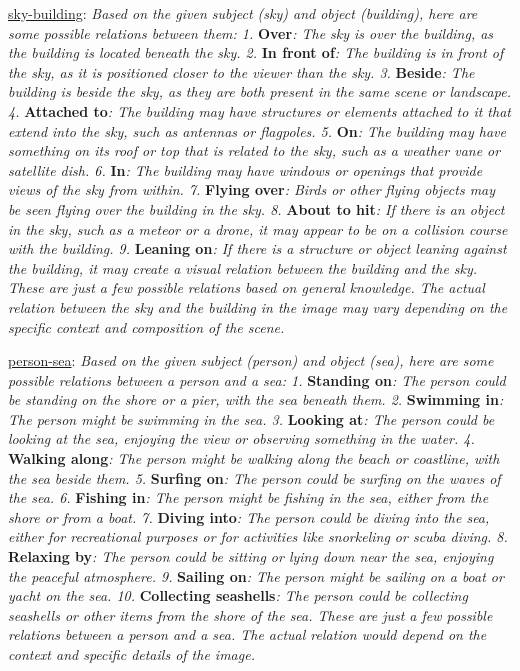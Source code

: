 \underline{sky-building}: \textit{Based on the given subject (sky) and object (building), here are some possible relations between them: 1.} \textbf{Over}\textit{: The sky is over the building, as the building is located beneath the sky. 2.} \textbf{In front of}\textit{: The building is in front of the sky, as it is positioned closer to the viewer than the sky. 3.} \textbf{Beside}\textit{: The building is beside the sky, as they are both present in the same scene or landscape. 4.} \textbf{Attached to}\textit{: The building may have structures or elements attached to it that extend into the sky, such as antennas or flagpoles. 5.} \textbf{On}\textit{: The building may have something on its roof or top that is related to the sky, such as a weather vane or satellite dish. 6.} \textbf{In}\textit{: The building may have windows or openings that provide views of the sky from within. 7.} \textbf{Flying over}\textit{: Birds or other flying objects may be seen flying over the building in the sky. 8.} \textbf{About to hit}\textit{: If there is an object in the sky, such as a meteor or a drone, it may appear to be on a collision course with the building. 9.} \textbf{Leaning on}\textit{: If there is a structure or object leaning against the building, it may create a visual relation between the building and the sky. These are just a few possible relations based on general knowledge. The actual relation between the sky and the building in the image may vary depending on the specific context and composition of the scene.}

\underline{person-sea}: \textit{Based on the given subject (person) and object (sea), here are some possible relations between a person and a sea: 1.} \textbf{Standing on}\textit{: The person could be standing on the shore or a pier, with the sea beneath them. 2.} \textbf{Swimming in}\textit{: The person might be swimming in the sea. 3.} \textbf{Looking at}\textit{: The person could be looking at the sea, enjoying the view or observing something in the water. 4.} \textbf{Walking along}\textit{: The person might be walking along the beach or coastline, with the sea beside them. 5.} \textbf{Surfing on}\textit{: The person could be surfing on the waves of the sea. 6.} \textbf{Fishing in}\textit{: The person might be fishing in the sea, either from the shore or from a boat. 7.} \textbf{Diving into}\textit{: The person could be diving into the sea, either for recreational purposes or for activities like snorkeling or scuba diving. 8.} \textbf{Relaxing by}\textit{: The person could be sitting or lying down near the sea, enjoying the peaceful atmosphere. 9.} \textbf{Sailing on}\textit{: The person might be sailing on a boat or yacht on the sea. 10.} \textbf{Collecting seashells}\textit{: The person could be collecting seashells or other items from the shore of the sea. These are just a few possible relations between a person and a sea. The actual relation would depend on the context and specific details of the image.}

